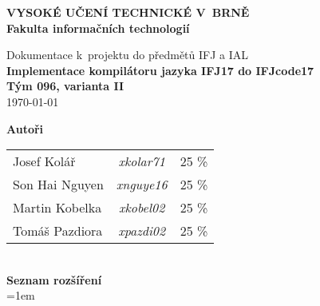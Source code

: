 \begin{titlepage}
    \centering

    {\fontsize{20pt}{15pt}\bfseries
    VYSOKÉ UČENÍ TECHNICKÉ V~BRNĚ\\
    \vspace{8pt}
    Fakulta informačních technologií
    }

    \vspace*{64pt}

    
    \vspace*{22pt}

    {\Large Dokumentace k~projektu do předmětů IFJ a IAL\\}
    \vspace*{18pt}
    {\LARGE \bfseries Implementace kompilátoru jazyka IFJ17 do IFJcode17\\}
    \vspace*{62pt}
    {\Large \bfseries Tým 096, varianta II\\}
    \vspace*{42pt}
    {\Large \today}

    \vspace*{64pt}
    {\Large \bfseries Autoři\\}
    \vspace*{8pt}
    \begin{tabular}{ l c r }
        Josef Kolář & \textit{xkolar71} & 25 \% \\
        Son Hai Nguyen & \textit{xnguye16} & 25 \% \\
        Martin Kobelka & \textit{xkobel02} & 25 \% \\
        Tomáš Pazdiora & \textit{xpazdi02} & 25 \% \\
    \end{tabular}\\
    \vspace*{92pt}
    {\Large \bfseries Seznam rozšíření\\}
    \vspace*{18pt}
    {\spaceskip=1em }\\ %

\end{titlepage}

